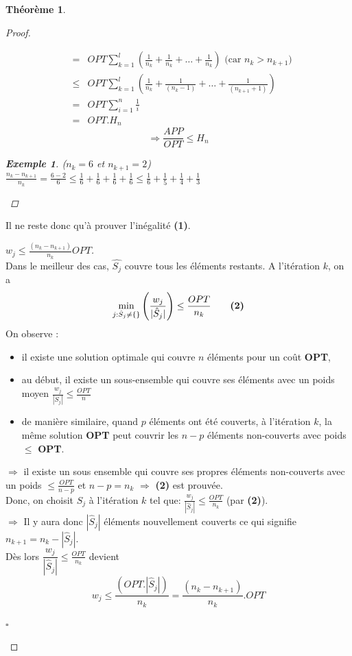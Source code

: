 \documentclass[12pt]{article}
\newcommand{\cqfd}{\begin{flushright}$\square$\end{flushright}}
\newtheorem{exemple}{Exemple}[section]
\newtheorem{thm}{Th\'eor\`eme}[section]
\newtheorem{proof}{Preuve}[section]
\begin{document}
\begin{thm}
\begin{proof}
\begin{itemize}
$$\begin{eqnarray}
	& = & OPT \sum_{k=1}^l \left(\frac{1}{n_k} + \frac{1}{n_k} + \ldots +
	  \frac{1}{n_k}\right) \text{ (car $n_k > n_{k+1}$)}\\
	& \leq & OPT \sum_{k=1}^{l} \left(\frac{1}{n_k} + \frac{1}{(n_k-1)} +\ldots +
          \frac{1}{(n_{k+1}+1)}\right)\\
	& = & OPT \sum_{i=1}^n \frac{1}{i} \\
	& = & OPT.H_n
\end{eqnarray}$$ $$\Rightarrow \frac{APP}{OPT} \leq H_n$$
\begin{exemple}($n_k=6$ et $n_{k+1}=2$) \\
$\frac{n_k - n_{k+1}}{n_k}=\frac{6-2} 6 \leq \frac 1 6 +\frac 1 6 +\frac 1 6 +
\frac 1 6 \leq \frac 1 6 +\frac 1 5 +\frac 1 4 +\frac 1 3$
\end{exemple}
\end{itemize}
\end{proof}
\end{thm}

Il ne reste donc qu'à prouver l'inégalité \textbf{(1)}. \\



\begin{proof}[$w_j \leq \frac{(n_k - n_{k+1})}{n_k}OPT$]$ $\\
Dans le meilleur des cas, $\hat{S_j}$ couvre tous les éléments restants.
A l'itération $k$, on a
$$ \min_{j:\hat{S}_j \neq \{\}} \left(\frac{w_j}{|\hat{S}_j|}\right) \leq
\frac{OPT}{n_k}\qquad \text{\textbf{(2)}}$$
On observe :
\begin{itemize}
\item il existe une solution optimale qui couvre $n$ éléments pour un coût
\textbf{OPT},
\item au début, il existe un sous-ensemble qui couvre ses éléments avec un poids
moyen $\frac{w_j}{|S_j|} \leq \frac{OPT}{n}$
\item de manière similaire, quand $p$ éléments ont été couverts, à l'itération
$k$, la même solution \textbf{OPT} peut couvrir les
$n-p$ éléments non-couverts avec poids $\leq$ \textbf{OPT}.
\end{itemize}
$\Rightarrow$ il existe un sous ensemble qui couvre ses propres éléments
non-couverts avec un poids $\leq \frac{OPT}{n-p}$ et $n-p = n_k$ $\Rightarrow$
\textbf{(2)} est prouvée. \\

\noindent Donc, on choisit $S_j$ à l'itération $k$ tel que:
$\frac{w_j}{|\hat{S}_j|} \leq \frac{OPT}{n_k}$ (par \textbf{(2)}).\\
$\Longrightarrow$ Il y aura donc $|\hat{S}_j|$ éléments nouvellement couverts ce
qui signifie $n_{k+1} = n_k-|\hat{S}_j| $. \\
Dès lors $\dfrac{w_j}{|\hat{S}_j|} \leq \frac{OPT}{n_k}$ devient
$$w_j \leq \frac{(OPT.|\hat{S}_j|)}{n_k} = \frac{(n_k-n_{k+1})}{n_k}.OPT$$

\cqfd
\end{proof}
\end{document}
